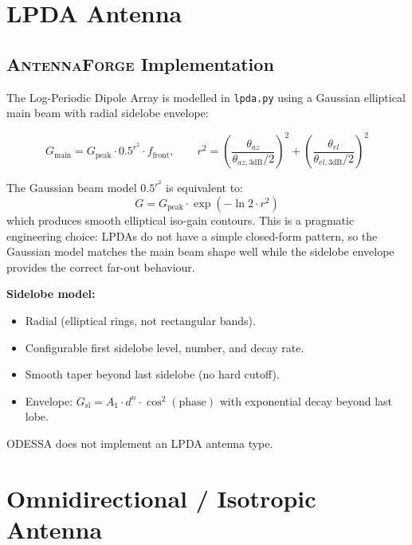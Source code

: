 \documentclass[11pt,a4paper]{article}
\newcommand{\AF}{\textsc{AntennaForge}}
\newcommand{\OD}{\textsc{ODESSA}}
\begin{document}
\section{LPDA Antenna}
\label{sec:lpda}

\subsection{\AF{} Implementation}

The Log-Periodic Dipole Array is modelled in \texttt{lpda.py} using a Gaussian
elliptical main beam with radial sidelobe envelope:

\begin{equation}
  G_\text{main} = G_\text{peak} \cdot 0.5^{r^2} \cdot f_\text{front},
  \qquad
  r^2 = \left(\frac{\theta_{az}}{\theta_{az,3\text{dB}}/2}\right)^2 +
        \left(\frac{\theta_{el}}{\theta_{el,3\text{dB}}/2}\right)^2
\end{equation}

The Gaussian beam model $0.5^{r^2}$ is equivalent to:
\[
  G = G_\text{peak} \cdot \exp(-\ln 2 \cdot r^2)
\]
which produces smooth elliptical iso-gain contours.  This is a pragmatic
engineering choice: LPDAs do not have a simple closed-form pattern, so the
Gaussian model matches the main beam shape well while the sidelobe envelope
provides the correct far-out behaviour.

\textbf{Sidelobe model:}
\begin{itemize}[leftmargin=2em]
  \item Radial (elliptical rings, not rectangular bands).
  \item Configurable first sidelobe level, number, and decay rate.
  \item Smooth taper beyond last sidelobe (no hard cutoff).
  \item Envelope: $G_\text{sl} = A_1 \cdot d^n \cdot \cos^2(\text{phase})$
    with exponential decay beyond last lobe.
\end{itemize}

\OD{} does not implement an LPDA antenna type.

\section{Omnidirectional / Isotropic Antenna}
\label{sec:omni}
\end{document}
